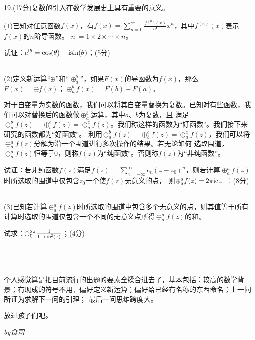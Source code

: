 \documentclass{ctexart}
\begin{document}
\pagestyle{empty}

19.\quad(17分)复数的引入在数学发展史上具有重要的意义。

(1)已知对任意函数$f(x)$，有$f(x)=\sum_{n = 0}^{\infty} \frac{f^{(n)}(x)}{n!}x^n$，其中$f^{(n)}(x)$表示$f(x)$的$n$阶导函数。
$n!=1\times 2\times \cdots \times n$。

试证：$e^{\rm{i}\theta}=\rm{cos}(\theta)+\rm{isin}(\theta)$；(5分)

~\\

(2)定义新运算“$\oplus $”和“$\oplus _a^b$”，如果$F(x)$的导函数为$f(x)$，那么$F(x)=\oplus f(x)$；$\oplus _a^bf(x)=F(b)-F(a)$。

对于自变量为实数的函数，我们可以将其自变量替换为复数。已知对有些函数，我们可以对替换后的函数做$\oplus _a^b$运算，其中$a$、$b$为复数，且
满足$\oplus _a^bf(z)+\oplus _b^cf(z)=\oplus _a^cf(z)$。我们称这样的函数为“好函数”。我们接下来研究的函数都为“好函数”。
利用$\oplus _a^bf(z)+\oplus _b^cf(z)=\oplus _a^cf(z)$，我们可以将$\oplus _a^af(z)$分解为沿一个围道进行多次操作的结果。若无论如何
选取围道，$\oplus _a^af(z)$恒等于0，则称$f(z)$为“纯函数”。否则称$f(z)$为“非纯函数”。

试证：若非纯函数$f(z)$满足$f(z)=\sum_{n = -\infty}^{\infty} c_n(z-z_0)^n$，则若计算$\oplus _a^af(z)$时所选取的围道中仅包含$z_0$一个使$f(z)$无意义的点，
则$\oplus _a^af(z)=2\pi \rm{i}c_{-1}$；(8分)

~\\

(3)已知若计算$\oplus _a^af(z)$时所选取的围道中包含多个无意义的点，则其值等于所有计算时选取的围道仅包含一个不同的无意义点所得$\oplus _a^af(z)$的和。

试求：$\oplus _0^{2\pi}\frac{1}{1+\rm{sin}^2\it{(x)}}$；(4分)

~\\
~\\
~\\

个人感觉算是把目前流行的出题的要素全糅合进去了，基本包括：较高的数学背景；有现成的符号不用，偏好定义新运算；偏好给已经有名称的东西命名；上一问所证为求解下一问的引理；
最后一问思维跨度大。

放过孩子们吧。

\hfill\it{by}\rm{食司}

\hfill\zhtoday
\end{document}
